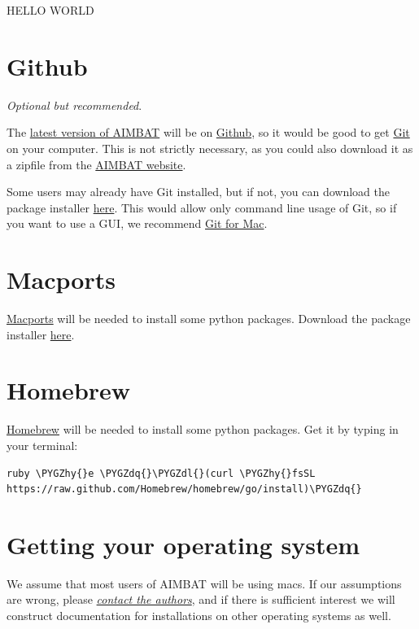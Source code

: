 \documentclass[letterpaper,10pt,english]{sphinxmanual}
\def\PYGZdl{\char`\$}
\def\PYGZhy{\char`\-}
\def\PYGZdq{\char`\"}
\begin{document}
HELLO WORLD


\section{Github}
\label{docfiles/install_dependencies:github}
\emph{Optional but recommended}.

The \href{https://github.com/pysmo}{latest version of AIMBAT} will be on \href{https://github.com/}{Github}, so it would be good to get \href{https://github.com/}{Git} on your computer. This is not strictly necessary, as you could also download it as a zipfile from the \href{http://www.earth.northwestern.edu/~xlou/aimbat.html}{AIMBAT website}.

Some users may already have Git installed, but if not, you can download the package installer \href{http://git-scm.com/download/mac}{here}. This would allow only command line usage of Git, so if you want to use a GUI, we recommend \href{https://mac.github.com/}{Git for Mac}.


\section{Macports}
\label{docfiles/install_dependencies:macports}
\href{http://www.macports.org/}{Macports} will be needed to install some python packages. Download the package installer \href{http://www.macports.org/install.php}{here}.


\section{Homebrew}
\label{docfiles/install_dependencies:homebrew}
\href{http://brew.sh/}{Homebrew} will be needed to install some python packages. Get it by typing in your terminal:

\begin{Verbatim}[commandchars=\\\{\}]
ruby \PYGZhy{}e \PYGZdq{}\PYGZdl{}(curl \PYGZhy{}fsSL https://raw.github.com/Homebrew/homebrew/go/install)\PYGZdq{}
\end{Verbatim}


\section{Getting your operating system}
\label{docfiles/install_dependencies:getting-your-operating-system}
We assume that most users of AIMBAT will be using macs. If our assumptions are wrong, please {\hyperref[docfiles/introduction:authors-contacts]{\emph{contact the authors}}}, and if there is sufficient interest we will construct documentation for installations on other operating systems as well.
\end{document}
